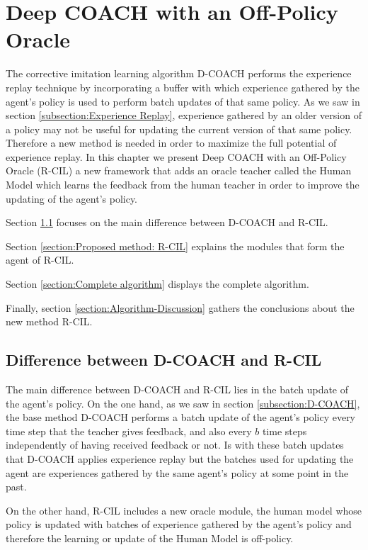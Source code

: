 \chapter{Deep COACH with an Off-Policy Oracle}
\label{chapter:Proposed Method}



The corrective imitation learning algorithm D-COACH performs the experience replay technique by incorporating a buffer with which experience gathered by the agent's policy is used to perform batch updates of that same policy. As we saw in section \ref{subsection:Experience Replay}, experience gathered by an older version of a policy may not be useful for updating the current version of that same policy. Therefore a new method is needed in order to maximize the full potential of experience replay. In this chapter we present Deep COACH with an Off-Policy Oracle (R-CIL) a new framework that adds an oracle teacher called the Human Model which learns the feedback from the human teacher in order to improve the updating of the agent's policy.

Section \ref{section:Difference between D-COACH and R-CIL} focuses on the main difference between D-COACH and R-CIL.

Section \ref{section:Proposed method: R-CIL} explains the modules that form the agent of R-CIL.

Section \ref{section:Complete algorithm} displays the complete algorithm. 

Finally, section \ref{section:Algorithm-Discussion} gathers the conclusions about the new method R-CIL.  



\section{Difference between D-COACH and R-CIL}
\label{section:Difference between D-COACH and R-CIL}

The main difference between D-COACH and R-CIL lies in the batch update of the agent's policy. On the one hand, as we saw in section \ref{subsection:D-COACH}, the base method D-COACH performs a batch update of the agent's policy every time step that the teacher gives feedback, and also every $b$ time steps independently of having received feedback or not. Is with these batch updates that D-COACH applies experience replay but the batches used for updating the agent are experiences gathered by the same agent's policy at some point in the past.

On the other hand, R-CIL includes a new oracle module, the human model whose policy is updated with batches of experience gathered by the agent's policy and therefore the learning or update of the Human Model is off-policy.



